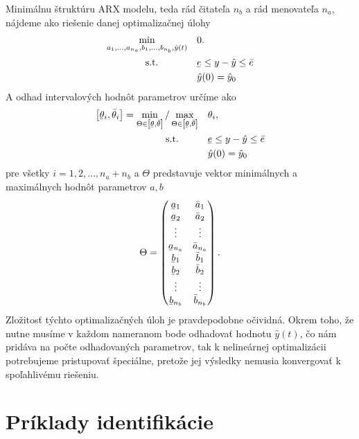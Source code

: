 Minimálnu štruktúru ARX modelu, teda rád čitateľa $ n_b $ a rád menovateľa $ n_a $, nájdeme ako riešenie danej optimalizačnej úlohy
\begin{equation}
	\begin{split}
		\min_{a_{1},\dots,a_{n_a},b_{1},\dots,b_{n_b},\hat{y}(t)} & \quad 0.\\
		\text{s.t.} \qquad \quad  & \quad \ubar{e} \leq y - \hat{y} \leq \bar{e} \\
		& \quad \hat{y}(0) = \hat{y}_{0}
	\end{split}
\end{equation}
A odhad intervalových hodnôt parametrov určíme ako
\begin{equation}
	\begin{split}
		\left[ \ubar{\theta}_i, \bar{\theta}_i \right] = \min_{\Theta \in \left[ \ubar{\theta}, \bar{\theta} \right]} / \max_{\Theta \in \left[ \ubar{\theta}, \bar{\theta} \right]} & \quad \theta_i,\\
		\text{s.t.} \qquad & \quad \ubar{e} \leq y - \hat{y} \leq \bar{e}\\
		& \quad \hat{y}(0) = \hat{y}_{0}
	\end{split}
\end{equation}
pre všetky $ i = 1,2, \dots, n_a+n_b $ a $ \Theta $ predstavuje vektor minimálnych a maximálnych hodnôt parametrov $ a, b $
\begin{equation*}
	\Theta = 
	\begin{pmatrix}
		\ubar{a}_{1} & \bar{a}_{1}\\
		\ubar{a}_{2} & \bar{a}_{2}\\
		\vdots & \vdots\\
		\ubar{a}_{n_a} & \bar{a}_{n_a}\\
		\ubar{b}_{1} & \bar{b}_{1}\\
		\ubar{b}_{2} & \bar{b}_{2}\\
		\vdots & \vdots\\
		\ubar{b}_{n_b} & \bar{b}_{n_b}\\	
	\end{pmatrix}.
\end{equation*}
Zložitosť týchto optimalizačných úloh je pravdepodobne očividná. Okrem toho, že nutne musíme v každom nameranom bode odhadovať hodnotu $ \hat{y}(t) $, čo nám pridáva na počte odhadovaných parametrov, tak k nelineárnej optimalizácii potrebujeme pristupovať špeciálne, pretože jej výsledky nemusia konvergovať k spoľahlivému riešeniu.

\section{Príklady identifikácie}